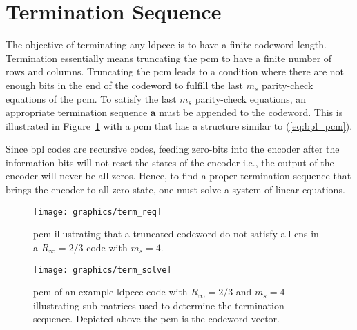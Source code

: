 \section{Termination Sequence}\label{sec:bpl_termi}
The objective of terminating any \ac{ldpccc} is to have a finite codeword length. Termination essentially means truncating the \ac{pcm} to have a finite number of rows and columns. Truncating the \ac{pcm} leads to a condition where there are not enough bits in the end of the codeword to fulfill the last $m_s$ parity-check equations of the \ac{pcm}. To satisfy the last $m_s$ parity-check equations, an appropriate termination sequence $\mathbf{a}$ must be appended to the codeword. This is illustrated in Figure~\ref{fig:term_req} with a \ac{pcm} that has a structure similar to (\ref{eq:bpl_pcm}).

Since \ac{bpl} codes are recursive codes, feeding zero-bits into the encoder after the information bits will not reset the states of the encoder i.e., the output of the encoder will never be all-zeros. Hence, to find a proper termination sequence that brings the encoder to all-zero state, one must solve a system of linear equations.

\begin{figure}[htbp]
  \centering
  \texttt{[image: graphics/term\_req]}
  \caption{\ac{pcm} illustrating that a truncated codeword do not satisfy all \acp{cn} in a $R_\infty=2/3$ code with $m_s=4$.}
  \label{fig:term_req}
\end{figure}

\begin{figure}[htbp]
  \centering
  \texttt{[image: graphics/term\_solve]}
  \caption{\ac{pcm} of an example \ac{ldpccc} code with $R_\infty=2/3$ and $m_s=4$ illustrating sub-matrices used to determine the termination sequence. Depicted above the \ac{pcm} is the codeword vector.}
  \label{fig:bpl_term}
\end{figure}

